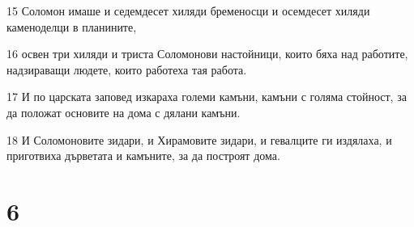 \par 15 Соломон имаше и седемдесет хиляди бременосци и осемдесет хиляди каменоделци в планините,
\par 16 освен три хиляди и триста Соломонови настойници, които бяха над работите, надзираващи людете, които работеха тая работа.
\par 17 И по царската заповед изкараха големи камъни, камъни с голяма стойност, за да положат основите на дома с дялани камъни.
\par 18 И Соломоновите зидари, и Хирамовите зидари, и гевалците ги издялаха, и приготвиха дърветата и камъните, за да построят дома.

\chapter{6}

